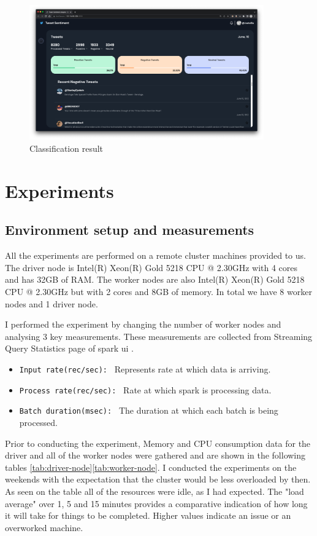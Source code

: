 \documentclass[12pt,a4paper]{report}
\begin{document}
\begin{figure}[H]
    \centering
\includegraphics[width=0.9\textwidth]{images/dashboardss.png}
    \caption{Classification result}
    \label{fig:confusion-svm}
\end{figure}

\chapter{Experiments}
\section{Environment setup and measurements}
All the experiments are performed on a remote cluster machines provided to us. The driver node is Intel(R) Xeon(R) Gold 5218 CPU @ 2.30GHz with 4 cores and has 32GB of RAM. The worker nodes are also Intel(R) Xeon(R) Gold 5218 CPU @ 2.30GHz but with 2 cores and 8GB of memory. In total we have 8 worker nodes and 1 driver node.

I performed the experiment by changing the number of worker nodes and analysing 3 key measurements. These measurements are collected from Streaming Query Statistics page of spark ui \cite{sparkAnalysis}.

\begin{itemize}
   \item \verb|Input rate(rec/sec): | Represents rate at which data is arriving.
   \item \verb|Process rate(rec/sec): | Rate at which spark is processing data.
   \item \verb|Batch duration(msec): | The duration at which each batch is being processed.
\end{itemize}

Prior to conducting the experiment, Memory and CPU consumption data for the driver and all of the worker nodes were gathered and are shown in the following tables \ref{tab:driver-node}\ref{tab:worker-node}. I conducted the experiments on the weekends with the expectation that the cluster would be less overloaded by then. As seen on the table all of the resources were idle, as I had expected. The "load average" over 1, 5 and 15 minutes provides a comparative indication of how long it will take for things to be completed. Higher values indicate an issue or an overworked machine.
\end{document}
